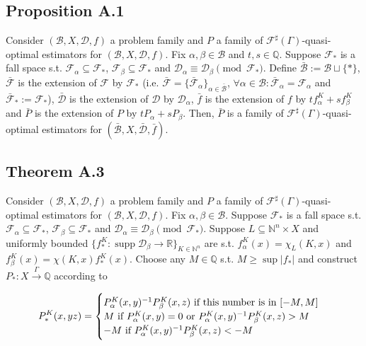 \documentclass[a4paper]{article}
\DeclareMathOperator{\Supp}{supp}
\newcommand{\Nats}{\mathbb{N}}
\newcommand{\Rats}{\mathbb{Q}}
\newcommand{\Reals}{\mathbb{R}}
\newcommand{\Abs}[1]{\lvert #1 \rvert}
\newcommand{\Dist}{\mathcal{D}}
\newcommand{\Fall}{\mathcal{F}}
\newcommand{\ESG}{\Fall^\sharp(\Gamma)}
\newcommand{\Scheme}{\xrightarrow{\Gamma}}
\newcommand{\Base}{\mathcal{B}}
\begin{document}
\subsection{Proposition A.1}

Consider ${(\Base,X,\Dist,f)}$ a problem family and ${P}$ a family of ${\ESG}$-quasi-optimal estimators for ${(\Base,X,\Dist,f)}$. Fix ${\alpha, \beta \in \Base}$ and ${t,s \in \Rats}$. Suppose ${\Fall_*}$ is a fall space s.t. ${\Fall_\alpha \subseteq \Fall_*}$, ${\Fall_\beta \subseteq \Fall_*}$ and ${\Dist_\alpha \equiv \Dist_\beta \pmod {\Fall_*}}$. Define ${\bar{\Base}:=\Base \sqcup \{*\}}$, ${\bar{\Fall}}$ is the extension of ${\Fall}$ by ${\Fall_*}$ (i.e. ${\bar{\Fall}}=\{\bar{\Fall}_\alpha\}_{\alpha \in \bar{\Base}}$, ${\forall \alpha \in \Base: \bar{\Fall}_\alpha = \Fall_\alpha}$ and ${\bar{\Fall}_*:=\Fall_*}$), ${\bar{\Dist}}$ is the extension of ${\Dist}$ by ${\Dist_\alpha}$, ${\bar{f}}$ is the extension of ${f}$ by ${t f_\alpha^K + s f_\beta^K}$ and ${\bar{P}}$ is the extension of ${P}$ by ${t P_\alpha + s P_\beta}$. Then, ${\bar{P}}$ is a family of ${\ESG}$-quasi-optimal estimators for ${(\bar{\Base},X,\bar{\Dist},\bar{f})}$.

\subsection{Theorem A.3}

Consider ${(\Base,X,\Dist,f)}$ a problem family and ${P}$ a family of ${\ESG}$-quasi-optimal estimators for ${(\Base,X,\Dist,f)}$. Fix ${\alpha, \beta \in \Base}$. Suppose ${\Fall_*}$ is a fall space s.t. ${\Fall_\alpha \subseteq \Fall_*}$, ${\Fall_\beta \subseteq \Fall_*}$ and ${\Dist_\alpha \equiv \Dist_\beta \pmod {\Fall_*}}$. Suppose ${L \subseteq \Nats^n \times X}$ and uniformly bounded ${\{f_*^K: \Supp \Dist_\beta \rightarrow \Reals\}_{K \in \Nats^n}}$ are s.t. ${f_\alpha^K(x) = \chi_L(K,x)}$ and ${f_\beta^K(x)=\chi(K,x) f_*^K(x)}$. Choose any ${M \in \Rats}$ s.t. ${M \geq \sup \Abs{f_*}}$ and construct ${P_{*}: X \Scheme \Rats}$ according to

$$P_*^K(x,yz)=\begin{cases}P_\alpha^K(x,y)^{-1} P_{\beta}^K(x,z) \textnormal{ if this number is in } [-M,M] \\ M \textnormal{ if } P_\alpha^K(x,y)=0 \textnormal{ or } P_\alpha^K(x,y)^{-1} P_{\beta}^K(x,z) > M\\ -M \textnormal{ if } P_\alpha^K(x,y)^{-1} P_{\beta}^K(x,z) < -M\end{cases}$$
\end{document}
